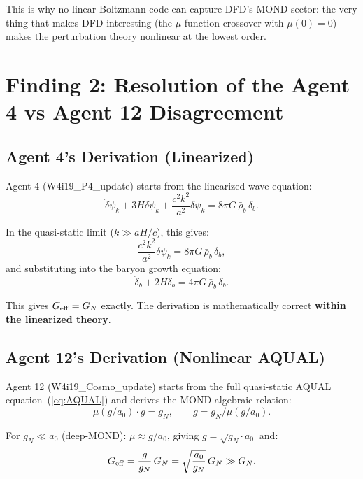 \documentclass[11pt]{article}
\theoremstyle{definition}
\theoremstyle{remark}
\newcommand{\Geff}{G_{\rm eff}}
\begin{document}
This is why no linear Boltzmann code can capture DFD's MOND sector:
the very thing that makes DFD interesting (the $\mu$-function
crossover with $\mu(0) = 0$) makes the perturbation theory nonlinear
at the lowest order.


\section{Finding 2: Resolution of the Agent 4 vs Agent 12 Disagreement}
\label{sec:resolution}

\subsection{Agent 4's Derivation (Linearized)}

Agent 4 (W4i19\_P4\_update) starts from the linearized wave equation:
\begin{equation}
\ddot\delta\psi_k + 3H\dot\delta\psi_k + \frac{c^2 k^2}{a^2}\delta\psi_k
= 8\pi G\,\bar\rho_b\,\delta_b.
\end{equation}

In the quasi-static limit ($k \gg aH/c$), this gives:
\begin{equation}
\frac{c^2 k^2}{a^2}\delta\psi_k = 8\pi G\,\bar\rho_b\,\delta_b,
\end{equation}
and substituting into the baryon growth equation:
\begin{equation}
\ddot\delta_b + 2H\dot\delta_b = 4\pi G\,\bar\rho_b\,\delta_b.
\end{equation}

This gives $\Geff = G_N$ exactly. The derivation is mathematically
correct \textbf{within the linearized theory}.

\subsection{Agent 12's Derivation (Nonlinear AQUAL)}

Agent 12 (W4i19\_Cosmo\_update) starts from the full quasi-static
AQUAL equation~(\ref{eq:AQUAL}) and derives the MOND algebraic
relation:
\begin{equation}
\mu(g/a_0)\cdot g = g_N, \qquad
g = g_N / \mu(g/a_0).
\end{equation}

For $g_N \ll a_0$ (deep-MOND): $\mu \approx g/a_0$, giving
$g = \sqrt{g_N \cdot a_0}$ and:
\begin{equation}
\Geff = \frac{g}{g_N}\,G_N = \sqrt{\frac{a_0}{g_N}}\,G_N \gg G_N.
\end{equation}
\end{document}
